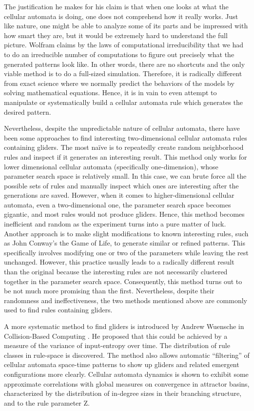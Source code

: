\documentclass[12pt]{article}
\numberwithin{figure}{section} %
\begin{document}
The justification he makes for his claim is that when one looks at what the cellular automata is doing, one does not comprehend how it really works. Just like nature, one might be able to analyze some of its parts and be impressed with how smart they are, but it would be extremely hard to understand the full picture. Wolfram claims by the laws of computational irreducibility that we had to do an irreducible number of computations to figure out precisely what the generated patterns look like. In other words, there are no shortcuts and the only viable method is to do a full-sized simulation. Therefore, it is radically different from exact science where we normally predict the behaviors of the models by solving mathematical equations. Hence, it is in vain to even attempt to manipulate or systematically build a cellular automata rule which generates the desired pattern. 

Nevertheless, despite the unpredictable nature of cellular automata, there have been some approaches to find interesting two-dimensional cellular automata rules containing gliders. The most naïve is to repeatedly create random neighborhood rules and inspect if it generates an interesting result. This method only works for lower dimensional cellular automata (specifically one-dimension), whose parameter search space is relatively small. In this case, we can brute force all the possible sets of rules and manually inspect which ones are interesting after the generations are saved. However, when it comes to higher-dimensional cellular automata, even a two-dimensional one, the parameter search space becomes gigantic, and most rules would not produce gliders. Hence, this method becomes inefficient and random as the experiment turns into a pure matter of luck. Another approach is to make slight modifications to known interesting rules, such as John Conway’s the Game of Life, to generate similar or refined patterns. This specifically involves modifying one or two of the parameters while leaving the rest unchanged. However, this practice usually leads to a radically different result than the original because the interesting rules are not necessarily clustered together in the parameter search space. Consequently, this method turns out to be not much more promising than the first. Nevertheless, despite their randomness and ineffectiveness, the two methods mentioned above are commonly used to find rules containing gliders. 

A more systematic method to find gliders is introduced by Andrew Wuensche in Collision-Based Computing \cite{Finding Gliders in Cellular Automata}. He proposed that this could be achieved by a measure of the variance of input-entropy over time. The distribution of rule classes in rule-space is discovered. The method also allows automatic “filtering” of cellular automata space-time patterns to show up gliders and related emergent configurations more clearly. Cellular automata dynamics is shown to exhibit some approximate correlations with global measures on convergence in attractor basins, characterized by the distribution of in-degree sizes in their branching structure, and to the rule parameter Z. 
\end{document}
